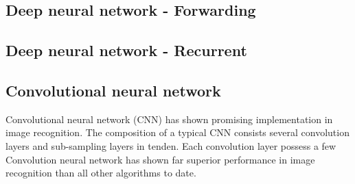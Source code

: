 \subsection{Deep neural network - Forwarding}
\subsection{Deep neural network - Recurrent}
\subsection{Convolutional neural network}
Convolutional neural network (CNN) has shown promising implementation in image recognition. The composition of a typical CNN consists several convolution layers and sub-sampling layers in tenden. Each convolution layer possess a few 
Convolution neural network has shown far superior performance in image recognition than all other algorithms to date.~\cite{Szegedy_2015}